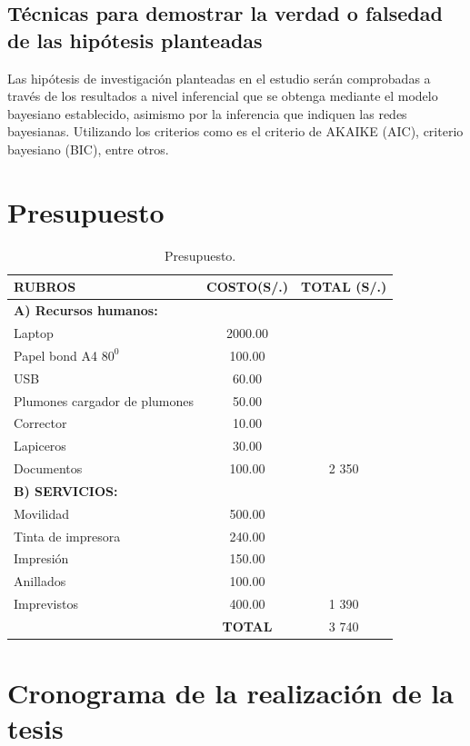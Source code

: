 \subsection{Técnicas para demostrar la verdad o falsedad de las hipótesis planteadas}
Las hipótesis de investigación planteadas en el estudio serán comprobadas a través de los resultados a nivel inferencial que se obtenga mediante el modelo bayesiano establecido, asimismo por la inferencia que indiquen las redes bayesianas. Utilizando los criterios como es el criterio de AKAIKE (AIC), criterio bayesiano (BIC), entre otros.

\section{Presupuesto}


\begin{table}[htb]
\centering
\begin{tabular}{|p{7cm}|c|c|}
\hline
\textbf{RUBROS} & \textbf{COSTO(S/.)}& \textbf{TOTAL (S/.)} \\ \hline
\textbf{A) Recursos humanos:} & & \\
Laptop & 2000.00& \\
Papel bond A4 $80^0$ &100.00 & \\
USB &60.00&\\
Plumones cargador de plumones&50.00&\\
Corrector &10.00&\\
Lapiceros &30.00&\\
Documentos &100.00& 2 350\\ \hline
\textbf{B) SERVICIOS:} &&\\
Movilidad &500.00& \\
Tinta de impresora &240.00& \\
Impresión &150.00 &\\
Anillados &100.00&\\
Imprevistos &400.00& 1 390\\ \hline
& \textbf{TOTAL}& 3 740\\
 \hline
\end{tabular}
\caption{Presupuesto.}
\label{tabla:final}
\end{table}



\section{Cronograma de la realización de la tesis}

